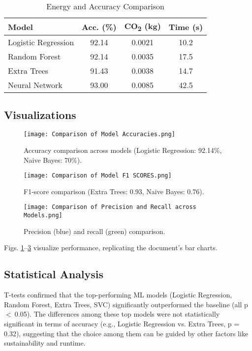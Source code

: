 \documentclass[conference]{IEEEtran}
\begin{document}
\begin{table}[htbp]
\small
\caption{Energy and Accuracy Comparison}
\begin{center}
\begin{tabular}{|l|c|c|c|}
\hline
\textbf{Model} & \textbf{Acc. (\%)} & \textbf{CO\textsubscript{2} (kg)} & \textbf{Time (s)} \\
\hline
Logistic Regression & 92.14 & 0.0021 & 10.2 \\
Random Forest & 92.14 & 0.0035 & 17.5 \\
Extra Trees & 91.43 & 0.0038 & 14.7 \\
Neural Network \cite{b6} & 93.00 & 0.0085 & 42.5 \\
\hline
\end{tabular}
\label{tab:energy}
\end{center}
\end{table}

\subsection{Visualizations}
\begin{figure}[htbp]
\centerline{\texttt{[image: Comparison of Model Accuracies.png]}}
\caption{Accuracy comparison across models (Logistic Regression: 92.14\%, Naive Bayes: 70\%).}
\label{fig:acc}
\end{figure}

\begin{figure}[htbp]
\centerline{\texttt{[image: Comparison of Model F1 SCORES.png]}}
\caption{F1-score comparison (Extra Trees: 0.93, Naive Bayes: 0.76).}
\label{fig:f1}
\end{figure}

\begin{figure}[htbp]
\centerline{\texttt{[image: Comparison of Precision and Recall across Models.png]}}
\caption{Precision (blue) and recall (green) comparison.}
\label{fig:pr}
\end{figure}

Figs. \ref{fig:acc}--\ref{fig:pr} visualize performance, replicating the document’s bar charts.

\subsection{Statistical Analysis}
T-tests confirmed that the top-performing ML models (Logistic Regression, Random Forest, Extra Trees, SVC) significantly outperformed the baseline (all p~$<~$0.05). The differences among these top models were not statistically significant in terms of accuracy (e.g., Logistic Regression vs. Extra Trees, p = 0.32), suggesting that the choice among them can be guided by other factors like sustainability and runtime.
\end{document}
